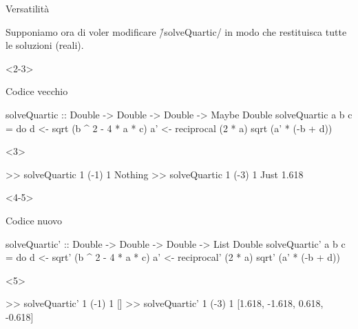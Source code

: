 \begin{frame}[fragile]{\secname}{Versatilità}
\begin{overlayarea}{\textwidth}{0.7\textheight}
Supponiamo ora di voler modificare \h/solveQuartic/ in modo che restituisca tutte le soluzioni (reali).

\begin{onlyenv}<2-3>
\begin{block}{Codice vecchio}
\begin{haskellcode}
solveQuartic
    :: Double -> Double -> Double -> Maybe Double
solveQuartic  a b c = do
    d  <- sqrt  (b ^ 2 - 4 * a * c)
    a' <- reciprocal  (2 * a)
    sqrt  (a' * (-b + d))
\end{haskellcode}

\begin{onlyenv}<3>
\begin{runhaskell}
>>  solveQuartic 1 (-1) 1
    Nothing
>>  solveQuartic 1 (-3) 1
    Just 1.618
\end{runhaskell}
\end{onlyenv}
\end{block}
\end{onlyenv}

\begin{onlyenv}<4-5>
\begin{block}{Codice nuovo}
\begin{haskellcode}
solveQuartic'
    :: Double -> Double -> Double -> List Double
solveQuartic' a b c = do
    d  <- sqrt' (b ^ 2 - 4 * a * c)
    a' <- reciprocal' (2 * a)
    sqrt' (a' * (-b + d))
\end{haskellcode}

\begin{onlyenv}<5>
\begin{runhaskell}
>>  solveQuartic' 1 (-1) 1
    []
>>  solveQuartic' 1 (-3) 1
    [1.618, -1.618, 0.618, -0.618]
\end{runhaskell}
\end{onlyenv}
\end{block}
\end{onlyenv}
\end{overlayarea}
\end{frame}